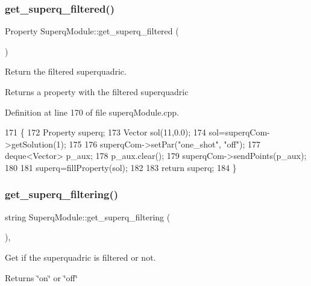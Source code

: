 \subsubsection{\texorpdfstring{get\+\_\+superq\+\_\+filtered()}{get\_superq\_filtered()}}
{\footnotesize\ttfamily Property Superq\+Module\+::get\+\_\+superq\+\_\+filtered (\begin{DoxyParamCaption}{ }\end{DoxyParamCaption})\hspace{0.3cm}{\ttfamily [protected]}}



Return the filtered superquadric. 

\begin{DoxyReturn}{Returns}
a property with the filtered superquadric 
\end{DoxyReturn}


Definition at line 170 of file superq\+Module.\+cpp.


\begin{DoxyCode}
171 \{
172     Property superq;
173     Vector sol(11,0.0);
174     sol=superqCom->getSolution(1);
175 
176     superqCom->setPar(\textcolor{stringliteral}{"one\_shot"}, \textcolor{stringliteral}{"off"});
177     deque<Vector> p\_aux;
178     p\_aux.clear();
179     superqCom->sendPoints(p\_aux);
180 
181     superq=fillProperty(sol);
182 
183     \textcolor{keywordflow}{return} superq;
184 \}
\end{DoxyCode}
\mbox{\label{classSuperqModule_a66cb1b371b92687d851b5ca23174198b}} 
\subsubsection{\texorpdfstring{get\+\_\+superq\+\_\+filtering()}{get\_superq\_filtering()}}
{\footnotesize\ttfamily string Superq\+Module\+::get\+\_\+superq\+\_\+filtering (\begin{DoxyParamCaption}{ }\end{DoxyParamCaption})\hspace{0.3cm}{\ttfamily [protected]}, {\ttfamily [virtual]}}



Get if the superquadric is filtered or not. 

\begin{DoxyReturn}{Returns}
\char`\"{}on\char`\"{} or \char`\"{}off\char`\"{} 
\end{DoxyReturn}


